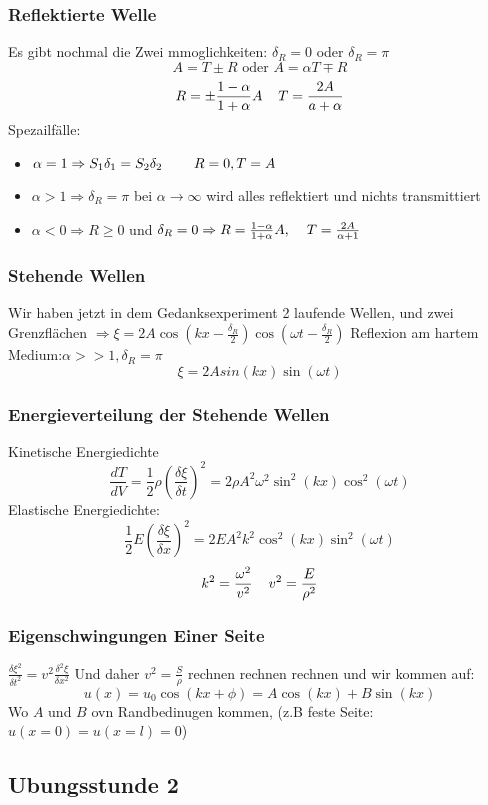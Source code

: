 \documentclass{article}
\newcommand{\mspc}{\hspace{0.4cm}}
\begin{document}
\subsubsection{Reflektierte Welle}
Es gibt nochmal die Zwei mmoglichkeiten: $\delta_R=0$ oder $\delta_R=\pi$ 
\[A=T\pm R \text{ oder } A=\alpha T\mp R\]
\[R=\pm\frac{1-\alpha}{1+\alpha}A\mspc T=\frac{2A}{a+\alpha}\]
Spezailfälle:

\begin{itemize}
\item{$\alpha=1\Rightarrow S_1\delta_1=S_2\delta_2\mspc\mspc R=0, T=A$}
\item{$\alpha>1\Rightarrow\delta_R=\pi$ bei $\alpha\rightarrow\infty$ wird alles reflektiert und nichts transmittiert}
\item{$\alpha<0\Rightarrow R\ge0$ und  $\delta_R=0\Rightarrow R=\frac{1-\alpha}{1+\alpha}A,\mspc T=\frac{2A}{\alpha+1}$}
\end{itemize}
\subsubsection{Stehende Wellen} Wir haben jetzt in dem Gedanksexperiment 2 laufende Wellen, und zwei Grenzflächen $\Rightarrow \xi=2A\cos(kx-\frac{\delta_R}{2})\cos(\omega t-\frac{\delta_R}{2})$
\newline Reflexion am hartem Medium:$\alpha>>1, \delta_R=\pi$
\[\xi=2Asin(kx)\sin(\omega t)\]
\subsubsection{Energieverteilung der Stehende Wellen} Kinetische Energiedichte \[\frac{dT}{dV}=\frac{1}{2}\rho\left(\frac{\delta\xi}{\delta t}\right)^2=2\rho A^2\omega^2\sin^2(kx)\cos^2(\omega t)\]
Elastische Energiedichte:
\[\frac{1}{2}E\left(\frac{\delta \xi}{\delta x}\right)^2=2EA^2k^2\cos^2(kx)\sin^2(\omega t)\]
\[k^2=\frac{\omega^2}{v^2}\mspc v^2=\frac{E}{\rho^2}\]
\subsubsection{Eigenschwingungen Einer Seite} $\frac{\delta\xi^2}{\delta t^2}=v^2\frac{\delta^2\xi}{\delta x^2}$ Und daher $v^2=\frac{S}{\rho}$ rechnen rechnen rechnen und wir kommen auf:
\[u(x)=u_0\cos(kx+\phi)=A\cos(kx)+B\sin(kx)\]
Wo $A$ und $B$ ovn Randbedinugen kommen, (z.B feste Seite: $u(x=0)=u(x=l)=0$)
\subsection{Ubungsstunde 2}
\end{document}
